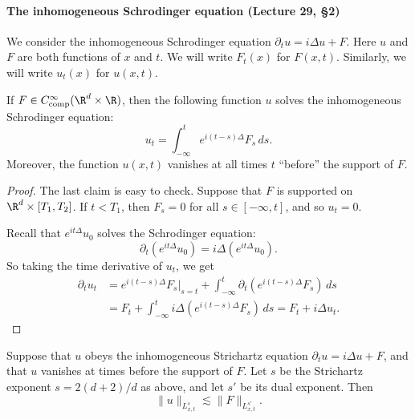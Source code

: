 \paragraph{The inhomogeneous Schrodinger equation (Lecture 29, \S2)}
We consider the inhomogeneous Schrodinger equation $\partial_tu=i\Delta u+F$. Here $u$ and $F$ are both functions of $x$ and $t$. We will write $F_t(x)$ for $F(x,t)$. Similarly, we will write $u_t(x)$ for $u(x,t)$.
\begin{proposition}
If $F\in C^\infty_{\mathrm{comp}}(\R^d\times\R)$, then the following function $u$ solves the inhomogeneous Schrodinger equation:
\[u_t=\int_{-\infty}^te^{i(t-s)\Delta}F_s\,ds.\]
Moreover, the function $u(x,t)$ vanishes at all times $t$ ``before'' the support of $F$.
\end{proposition}
\begin{proof}
The last claim is easy to check. Suppose that $F$ is supported on $\R^d\times[T_1,T_2]$. If $t<T_1$, then $F_s=0$ for all $s\in[-\infty,t]$, and so $u_t=0$.

Recall that $e^{it\Delta}u_0$ solves the Schrodinger equation:
\[\partial_t(e^{it\Delta}u_0)=i\Delta(e^{it\Delta}u_0).\]
So taking the time derivative of $u_t$, we get
\begin{align*}
\partial_tu_t&=e^{i(t-s)\Delta}F_s\big|_{s=t}+\int_{-\infty}^t\partial_t(e^{i(t-s)\Delta}F_s)\,ds\\
&=F_t+\int_{-\infty}^ti\Delta(e^{i(t-s)\Delta}F_s)\,ds=F_t+i\Delta u_t.
\end{align*}
\end{proof}
\begin{theorem}
Suppose that $u$ obeys the inhomogeneous Strichartz equation $\partial_tu=i\Delta u+F$, and that $u$ vanishes at times before the support of $F$. Let $s$ be the Strichartz exponent $s=2(d+2)/d$ as above, and let $s'$ be its dual exponent. Then
\[\|u\|_{L^s_{x,t}}\lesssim\|F\|_{L^{s'}_{x,t}}.\]
\end{theorem}

